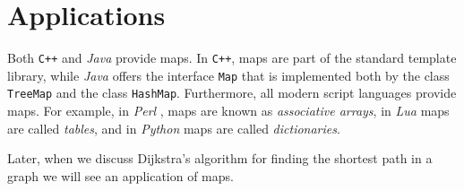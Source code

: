 \section{Applications}
Both \texttt{C++} and \textsl{Java} provide maps.  In \texttt{C++}, maps are part of the standard
template library, while \textsl{Java} offers the interface \texttt{Map} that is implemented both by
the class \texttt{TreeMap} and the class \texttt{HashMap}. Furthermore, all modern script languages provide maps.
For example, in \textsl{Perl} \cite{Wall92}, maps are known as \emph{associative arrays}, in \textsl{Lua} 
\cite{ierusalimschy:2006,Ieru96a} maps are called \emph{tables}, and in \textsl{Python} 
\cite{vanRossum:95,lutz:09} maps are called \emph{dictionaries}.  

Later, when we discuss Dijkstra's algorithm for finding the shortest path in a graph we will see an
application of maps.

